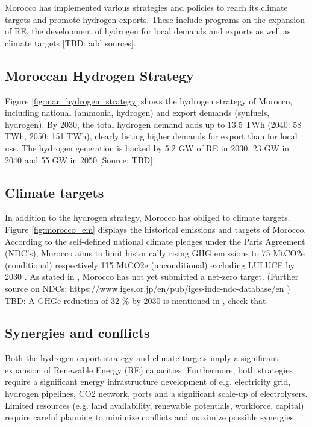 Morocco has implemented various strategies and policies to reach its climate targets and promote hydrogen exports. These include programs on the expansion of RE, the development of hydrogen for local demands and exports as well as climate targets [TBD: add sources].


\subsection{Moroccan Hydrogen Strategy}
Figure \ref{fig:mar_hydrogen_strategy} shows the hydrogen strategy of Morocco, including
national (ammonia, hydrogen) and export demands (synfuels, hydrogen).
By 2030, the total hydrogen demand adds up to 13.5 TWh (2040: 58 TWh, 2050: 151 TWh), 
clearly listing higher demands for export than for local use. The hydrogen generation is backed by 5.2 GW of RE in 2030, 23 GW in 2040 and 55 GW in 2050 [Source: TBD].

\subsection{Climate targets}
In addition to the hydrogen strategy, Morocco has obliged to climate targets.
Figure \ref{fig:morocco_em} displays the historical emissions and targets of Morocco.
According to the self-defined national climate pledges under the Paris Agreement (NDC's), Morocco aims to limit historically rising GHG emissions to 75 MtCO2e (conditional) respectively 115 MtCO2e (unconditional) excluding LULUCF by 2030 \cite{CAT2021}. 
As stated in \cite{CAT2021}, Morocco has not yet submitted a net-zero target. (Further source on NDCs: https://www.iges.or.jp/en/pub/iges-indc-ndc-database/en )
TBD: A GHGe reduction of 32 \% by 2030 is mentioned in \cite[5]{Boulakhbar2020}, check that.

\subsection{Synergies and conflicts}
Both the hydrogen export strategy and climate targets imply a significant expansion of Renewable Energy (RE) capacities. Furthermore, both strategies require a significant energy infrastructure development of e.g. electricity grid, hydrogen pipelines, CO2 network, ports and a significant scale-up of electrolysers.
Limited resources (e.g. land availability, renewable potentials, workforce, capital) require careful planning to minimize conflicts and maximize possible synergies.

